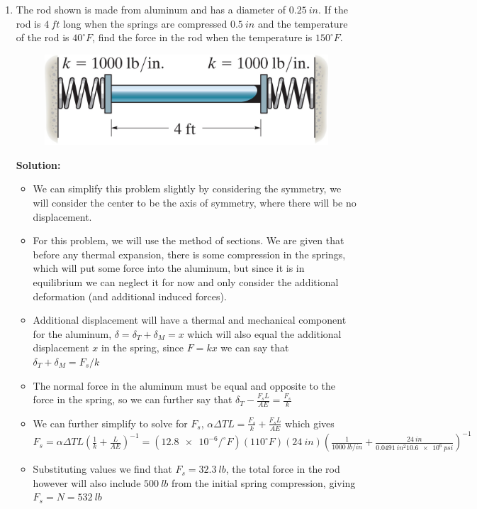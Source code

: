 \documentclass[12pt, oneside]{article}
\let\US\SI
\begin{document}
\begin{enumerate}
	\item %
		The rod shown is made from aluminum and has a diameter of $\US{0.25}{in}$.
		If the rod is $\US{4}{ft}$ long when the springs are compressed $\US{0.5}{in}$ and the temperature of the rod is $40 ^\circ F$, find the force in the rod when the temperature is $150 ^\circ F$.
		\begin{figure}[H]
			\centering
			\includegraphics[width=0.8\linewidth]{4-70}
		\end{figure}
		\textbf{Solution:}
		\begin{itemize}
			\item We can simplify this problem slightly by considering the symmetry, we will consider the center to be the axis of symmetry, where there will be no displacement.
      \item For this problem, we will use the method of sections. We are given that before any thermal expansion, there is some compression in the springs, which will put some force into the aluminum, but since it is in equilibrium we can neglect it for now and only consider the additional deformation (and additional induced forces).
			\item Additional displacement will have a thermal and mechanical component for the aluminum, $\delta = \delta_T + \delta_M = x$ which will also equal the additional displacement $x$ in the spring, since $F=kx$ we can say that $\delta_T + \delta_M = F_s/k$
			\item The normal force in the aluminum must be equal and opposite to the force in the spring, so we can further say that $\delta_T - \frac{F_s L}{AE} = \frac{F_s}{k} $
      \item We can further simplify to solve for $F_s$, $\alpha \Delta T L = \frac{F_s}{k} + \frac{F_s L}{A E}$ which gives $F_s = \alpha \Delta T L \left( \frac{1}{k} + \frac{L}{AE} \right)^{-1} = (\num{12.8e-6}/^\circ F) (\num{110}^\circ F) (\US{24}{in}) \left( \frac{1}{\US{1000}{lb/in}} + \frac{\US{24}{in}}{\US{0.0491}{in^2} \US{10.6e6}{psi}} \right)^{-1}$
			\item Substituting values we find that $F_s = \US{32.3}{lb}$, the total force in the rod however will also include $\US{500}{lb}$ from the initial spring compression, giving $F_s = N = \US{532}{lb}$
		\end{itemize}


\end{enumerate}
\end{document}
